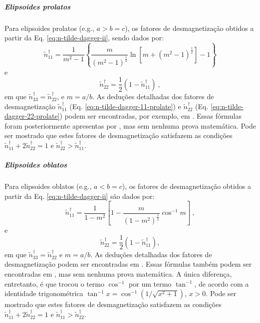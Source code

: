\subparagraph*{Elipsoides prolatos}

Para elipsoides prolatos (e.g., $a > b = c$), os fatores de desmagnetização
obtidos a partir da Eq. \ref{eq:n-tilde-dagger-ii}, sendo dados por:
\begin{equation}
\tilde{n}^{\dagger}_{11} = \frac{1}{m^{2} - 1}
\left\lbrace \frac{m}{\left( m^{2} - 1 \right)^{\frac{1}{2}}}
\ln \left[ m + \left( m^{2} - 1 \right)^{\frac{1}{2}} \right]
- 1 \right\rbrace
\label{eq:n-tilde-dagger-11-prolate}
\end{equation}
e
\begin{equation}
\tilde{n}^{\dagger}_{22} = \frac{1}{2} \left(1 - \tilde{n}^{\dagger}_{11} \right) \: ,
\label{eq:n-tilde-dagger-22-prolate}
\end{equation}
em que $\tilde{n}^{\dagger}_{33} = \tilde{n}^{\dagger}_{22}$, 
e $m = a/b$.
As deduções detalhadas dos fatores de desmagnetização 
$\tilde{n}^{\dagger}_{11}$ (Eq. \ref{eq:n-tilde-dagger-11-prolate}) 
e $\tilde{n}^{\dagger}_{22}$ (Eq. \ref{eq:n-tilde-dagger-22-prolate})
podem ser encontradas, por exemplo, em \citet{stoner1945}. 
Essas fórmulas foram posteriormente apresentas por
\citet{emerson1985}, mas sem nenhuma prova matemática.
Pode ser mostrado que estes fatores de desmagnetização satisfazem as condições $\tilde{n}^{\dagger}_{11} + 2 \tilde{n}^{\dagger}_{22} = 1$ e $\tilde{n}^{\dagger}_{22} > \tilde{n}^{\dagger}_{11}$.

\subparagraph*{Elipsoides oblatos}

Para elipsoides oblatos (e.g., $a < b = c$), os fatores de desmagnetização obtidos 
a partir da Eq. \ref{eq:n-tilde-dagger-ii} são dados por:
\begin{equation}
\tilde{n}^{\dagger}_{11} = 
\frac{1}{1 - m^{2}} \left[
1 - \frac{m}{\left( 1 - m^{2} \right)^{\frac{1}{2}}} \cos^{-1}m
\right] \: ,
\label{eq:n-tilde-dagger-11-oblate}
\end{equation}
e
\begin{equation}
\tilde{n}^{\dagger}_{22} = 
\frac{1}{2} \left(1 - \tilde{n}^{\dagger}_{11}\right) ,
\label{eq:n-tilde-dagger-22-oblate}
\end{equation}
em que $\tilde{n}^{\dagger}_{33}=\tilde{n}^{\dagger}_{22}$ e $m = a/b$.
As deduções detalhadas dos fatores de desmagnetização 
podem ser encontradas em \citet{stoner1945}. Essas fórmulas
também podem ser encontradas em \citet{emerson1985}, mas sem nenhuma prova matemática.
A única diferença, entretanto, é que \citet{emerson1985} trocou o termo $\cos^{-1}$
por um termo $\tan^{-1}$, de acordo com a identidade trigonométrica
$\tan^{-1}x = \cos^{-1}(1/\sqrt{x^{2} + 1})$, $x > 0$. Pode ser mostrado que estes fatores de desmagnetização satisfazem as condições $\tilde{n}^{\dagger}_{11} + 2 \tilde{n}^{\dagger}_{22} = 1$ e $\tilde{n}^{\dagger}_{11} > \tilde{n}^{\dagger}_{22}$.

